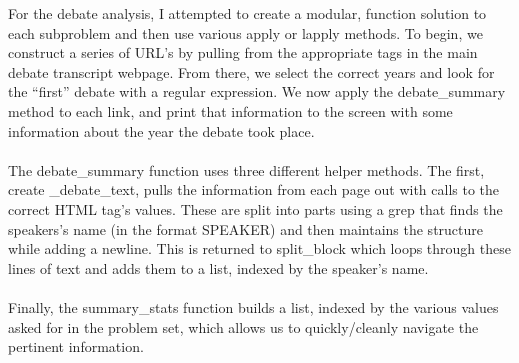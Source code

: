 \documentclass{article}\usepackage[]{graphicx}\usepackage[]{color}
\begin{document}
For the debate analysis, I attempted to create a modular, function solution to each subproblem and then use various apply or lapply methods.  To begin, we construct a series of URL's by pulling from the appropriate tags in the main debate transcript webpage.  From there, we select the correct years and look for the ``first'' debate with a regular expression.  We now apply the debate\_summary method to each link, and print that information to the screen with some information about the year the debate took place.\\\\
The debate\_summary function uses three different helper methods.  The first, create \_debate\_text, pulls the information from each page out with calls to the correct HTML tag's values.  These are split into parts using a grep that finds the speakers's name (in the format SPEAKER) and then maintains the structure while adding a newline.  This is returned to split\_block which loops through these lines of text and adds them to a list, indexed by the speaker's name.\\\\
Finally, the summary\_stats function builds a list, indexed by the various values asked for in the problem set, which allows us to quickly/cleanly navigate the pertinent information.
\end{document}
